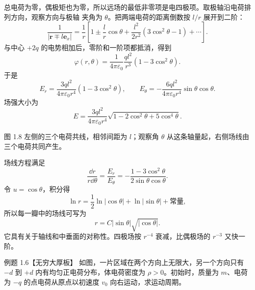 \begin{xesolution}
总电荷为零，偶极矩也为零，所以远场的最低非零项是电四极项。取极轴沿电荷排列方向，观察方向与极轴
夹角为 $\theta$。把两端电荷的距离倒数按 $l/r$ 展开到二阶：
\[
  \frac1{|\boldsymbol r\mp l\boldsymbol e_x|}
  =\frac1r\left[1\pm\frac lr\cos\theta
  +\frac{l^2}{2r^2}(3\cos^2\theta-1)+\cdots\right].
\]
与中心 $+2q$ 的电势相加后，零阶和一阶项都抵消，得到
\[
  \boxed{\varphi(r,\theta)=\frac{1}{4\pi\varepsilon_0}
  \frac{ql^2}{r^3}(1-3\cos^2\theta)}.
\]
于是
\[
  \boxed{E_r=\frac{3ql^2}{4\pi\varepsilon_0r^4}(1-3\cos^2\theta)},
  \qquad
  \boxed{E_\theta=-\frac{6ql^2}{4\pi\varepsilon_0r^4}\sin\theta\cos\theta}.
\]
场强大小为
\[
  \boxed{E=\frac{3ql^2}{4\pi\varepsilon_0r^4}
  \sqrt{1-2\cos^2\theta+5\cos^4\theta}}.
\]

图 1.8 左侧的三个电荷共线，相邻间距为 $l$；观察角 $\theta$ 从这条轴量起，右侧场线由三个电荷共同产生。

\quadrupoleFarFigure
{}

场线方程满足
\[
  \frac{\dd r}{r\dd\theta}
  =\frac{E_r}{E_\theta}
  =-\frac{1-3\cos^2\theta}{2\sin\theta\cos\theta}.
\]
令 $u=\cos\theta$，积分得
\[
  \ln r=\frac12\ln|\cos\theta|+\ln|\sin\theta|+\text{常量},
\]
所以每一瓣中的场线可写为
\[
  \boxed{r=C|\sin\theta|\sqrt{|\cos\theta|}}.
\]
它具有关于轴线和中垂面的对称性。四极场按 $r^{-4}$ 衰减，比偶极场的 $r^{-3}$ 又快一阶。
\end{xesolution}

\begin{origexamplebox}{例题 1.6【无穷大厚板】}
如图，一片区域在两个方向上无限大，另一个方向只有 $-d$ 到 $+d$ 内有均匀正电荷分布，体电荷密度为
$\rho>0$。初始时，质量为 $m$、电荷为 $-q$ 的点电荷从原点以初速度 $v_0$ 向右运动，求运动周期。
\emSlabQuestion
{}\label{fig:em-question-6}
\end{origexamplebox}

